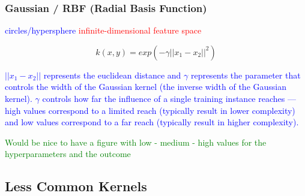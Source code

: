\subsubsection{Gaussian / RBF (Radial Basis Function)}

\textcolor{blue}{circles/hypersphere}
\textcolor{red}{infinite-dimensional feature space}

\begin{equation}
{k(x, y) = exp(- \gamma || x_1 - x_2 || ^2 ) }
\label{eq:kernel_guassian_rbf_eq}
\end{equation}

\textcolor{blue}{$|| x_1 - x_2 ||$ represents the euclidean distance and $\gamma$ represents the parameter that controls the width of the Gaussian kernel (the inverse width of the Gaussian kernel). $\gamma$ controls how far the influence of a single training instance reaches --- high values correspond to a limited reach (typically result in lower complexity) and low values correspond to a far reach (typically result in higher complexity).}

\textcolor{green}{Would be nice to have a figure with low - medium - high values for the hyperparameters and the outcome}


\subsection{Less Common Kernels}










